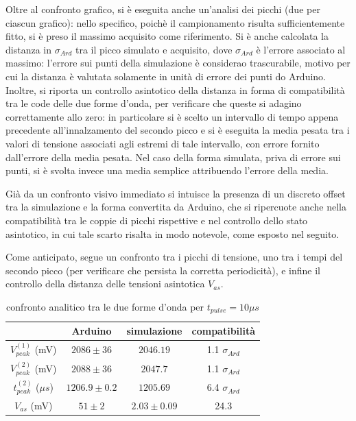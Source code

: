 \documentclass{article}
\begin{document}
Oltre al confronto grafico, si è eseguita anche un'analisi dei picchi (due per ciascun grafico): nello specifico, poichè il campionamento risulta sufficientemente fitto, si è preso il massimo
acquisito come riferimento. Si è anche calcolata la distanza in 
$\sigma_{Ard}$ tra il picco simulato e acquisito, dove $\sigma_{Ard}$ è l'errore associato al massimo: l'errore sui punti della simulazione
è considerao trascurabile, motivo per cui la distanza è valutata solamente in unità di errore dei punti do Arduino.
Inoltre, si riporta un controllo asintotico della distanza in forma di compatibilità tra le code delle due forme d'onda, per verificare che queste 
si adagino correttamente allo zero: in particolare si è scelto un intervallo di tempo appena precedente all'innalzamento del secondo picco e si è eseguita la media
pesata tra i valori di tensione associati agli estremi di tale intervallo, con errore fornito dall'errore della media pesata. Nel caso della forma simulata, priva di 
errore sui punti, si è svolta invece una media semplice attribuendo l'errore della media.

Già da un confronto visivo immediato si intuisce la presenza di un discreto offset tra la simulazione e la forma convertita da Arduino, che si ripercuote
anche nella compatibilità tra le coppie di picchi rispettive e nel controllo dello stato asintotico, in cui tale scarto risalta in modo notevole, come esposto
nel seguito.


Come anticipato, segue un confronto tra i picchi di tensione, uno tra i tempi del secondo picco (per verificare che persista la corretta periodicità),
e infine il controllo della distanza delle tensioni asintotica $V_{as}$. 

\begin{table}[H]
    \centering
    \begin{tabular}{cccc}
        \toprule
                        & Arduino & simulazione & compatibilità \\
        \midrule
        $V_{peak}^{(1)}$ (mV)&   $2086 \pm 36$ & $2046.19$ & 1.1 $\sigma_{Ard}$\\
        $V_{peak}^{(2)}$ (mV)&   $2088 \pm 36$ & $2047.7$ & 1.1 $\sigma_{Ard}$\\
        $t_{peak}^{(2)}$ ($\mu s$)&   $1206.9 \pm 0.2$ & $1205.69$ & 6.4 $\sigma_{Ard}$\\
        $V_{as}$       (mV)&   $51 \pm 2$ & $2.03 \pm 0.09$ & 24.3 \\
        \bottomrule
    \end{tabular}
    \caption{confronto analitico tra le due forme d'onda per $t_{pulse}=10 \mu s$}
\end{table}
\end{document}
